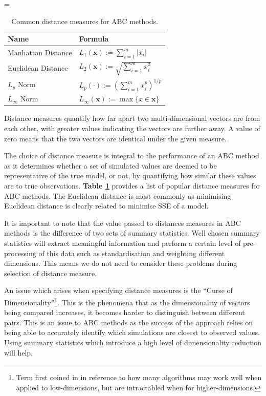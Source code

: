 \documentclass[11pt,a4paper]{article}
\theoremstyle{break}
\begin{document}
  \begin{table}
    \everymath={\displaystyle}
    \centering
    \begin{tabular}{|l|l|}
      \hline
      \textbf{Name}&\textbf{Formula}\\\hline
      Manhattan Distance&$L_1(\mathbf{x}):=\sum_{i=1}^m|x_i|$\\\hline
      Euclidean Distance&$L_2(\mathbf{x}):=\sqrt{\sum_{i=1}^mx_i^2}$\\\hline
      $L_p$ Norm&$L_p(\cdot):=\left(\sum_{i=1}^mx_i^p\right)^{1/p}$\\\hline
      $L_\infty$ Norm&$L_\infty(\mathbf{x}):=\max\{x\in \mathbf{x}\}$\\\hline
    \end{tabular}
    \caption{Common distance measures for ABC methods.}
    \label{tab_common_distances}
  \end{table}

  \par Distance measures quantify how far apart two multi-dimensional vectors are from each other, with greater values indicating the vectors are further away. A value of zero means that the two vectors are identical under the given measure.

  \par The choice of distance measure is integral to the performance of an ABC method as it determines whether a set of simulated values are deemed to be representative of the true model, or not, by quantifying how similar these values are to true observations. \textbf{Table \ref{tab_common_distances}} provides a list of popular distance measures for ABC methods. The Euclidean distance is most commonly as minimising Euclidean distance is clearly related to minimise SSE of a model.

  \par It is important to note that the value passed to distances measures in ABC methods is the difference of two sets of summary statistics. Well chosen summary statistics will extract meaningful information and perform a certain level of pre-processing of this data such as standardisation and weighting different dimensions. This means we do not need to consider these problems during selection of distance measure.

  \par An issue which arises when specifying distance measures is the ``Curse of Dimensionality''\footnote{Term first coined in \cite[]{adaptive_control_processes} in reference to how many algorithms may work well when applied to low-dimensions, but are intractabled when for higher-dimensions.}. This is the phenomena that as the dimensionality of vectors being compared increases, it becomes harder to distinguish between different pairs. This is an issue to ABC methods as the success of the approach relies on being able to accurately identify which simulations are closest to observed values. Using summary statistics which introduce a high level of dimensionality reduction will help.
\end{document}

